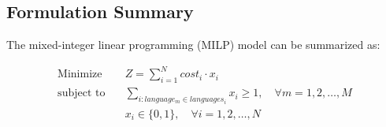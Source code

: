 \documentclass{article}
\begin{document}
\subsection*{Formulation Summary}
The mixed-integer linear programming (MILP) model can be summarized as:

\begin{align*}
\text{Minimize} \quad & Z = \sum_{i=1}^{N} cost_i \cdot x_i \\
\text{subject to} \quad & \sum_{i: language_m \in languages_i} x_i \geq 1, \quad \forall m = 1, 2, \ldots, M \\
& x_i \in \{0, 1\}, \quad \forall i = 1, 2, \ldots, N
\end{align*}
\end{document}
